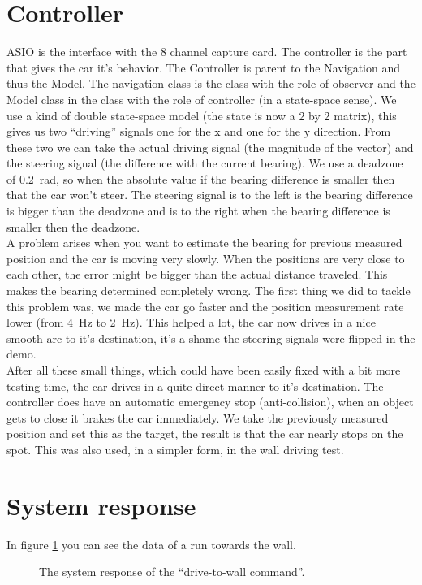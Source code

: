 \documentclass[final]{scrreprt} %
\begin{document}
\section{Controller}
ASIO is the interface with the 8 channel capture card.
The controller is the part that gives the car it's behavior.
The Controller is parent to the Navigation and thus the Model.
The navigation class is the class with the role of observer and the Model class in the class with the role of controller (in a state-space sense).
We use a kind of double state-space model (the state is now a 2 by 2 matrix), this gives us two ``driving'' signals one for the x and one for the y direction.
From these two we can take the actual driving signal (the magnitude of the vector) and the steering signal (the difference with the current bearing).
We use a deadzone of \SI{0.2}{\radian}, so when the absolute value if the bearing difference is smaller then that the car won't steer.
The steering signal is to the left is the bearing difference is bigger than the deadzone and is to the right when the bearing difference is smaller then the deadzone.\\
A problem arises when you want to estimate the bearing for previous measured position and the car is moving very slowly. 
When the positions are very close to each other, the error might be bigger than the actual distance traveled.
This makes the bearing determined completely wrong.
The first thing we did to tackle this problem was, we made the car go faster and the position measurement rate lower (from \SI{4}{\hertz} to \SI{2}{\hertz}).
This helped a lot, the car now drives in a nice smooth arc to it's destination, it's a shame the steering signals were flipped in the demo.\\
After all these small things, which could have been easily fixed with a bit more testing time, the car drives in a quite direct manner to it's destination.
The controller does have an automatic emergency stop (anti-collision), when an object gets to close it brakes the car immediately.
We take the previously measured position and set this as the target, the result is that the car nearly stops on the spot.
This was also used, in a simpler form, in the wall driving test.


\section{System response}
In figure \ref{fig:system-response} you can see the data of a run towards the wall.
\begin{figure}[H]
	\centering
    	\setlength\figureheight{4cm}
    	\setlength{}
    	    	
    	\caption{The system response of the “drive-to-wall command”.}
    	\label{fig:system-response}
\end{figure}
\end{document}

